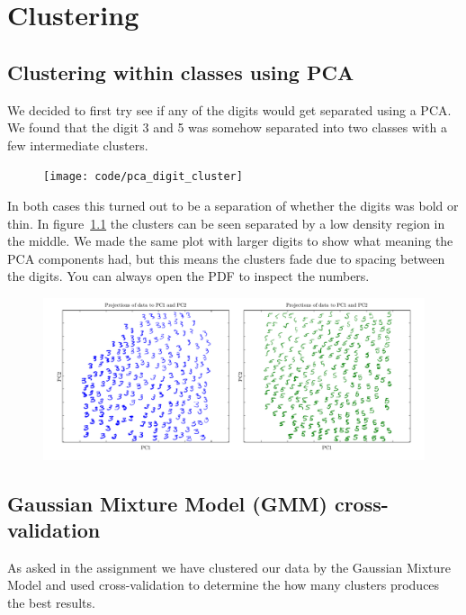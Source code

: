 \chapter{Clustering}


\section{Clustering within classes using PCA}
We decided to first try see if any of the digits would get separated using a PCA. We found that the digit 3 and 5 was somehow separated into two classes with a few intermediate clusters.

\begin{figure}[H]
\centering
\texttt{[image: code/pca\_digit\_cluster]}
\caption{}
\label{fig:pca_cluster}
\end{figure}

In both cases this turned out to be a separation of whether the digits was bold or thin. In figure~\ref{fig:pca_cluster} the clusters can be seen separated by a low density region in the middle. We made the same plot with larger digits to show what meaning the PCA components had, but this means the clusters fade due to spacing between the digits. You can always open the PDF to inspect the numbers.

\begin{figure}[H]
\centering
\includegraphics[width=1\linewidth]{code/pca_digit_cluster_z}
\caption{}
\label{fig:pca_cluster_zoom}
\end{figure}


\section{Gaussian Mixture Model (GMM) cross-validation}

As asked in the assignment we have clustered our data by the Gaussian Mixture Model and used cross-validation to determine the how many clusters produces the best results. \\

